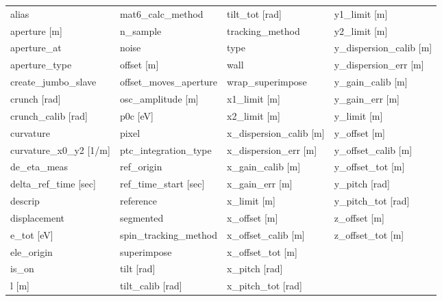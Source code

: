  \begin{tabular}{llll} \toprule
alias                            & mat6_calc_method                 & tilt_tot [rad]                   & y1_limit [m]                     \\
aperture [m]                     & n_sample                         & tracking_method                  & y2_limit [m]                     \\
aperture_at                      & noise                            & type                             & y_dispersion_calib [m]           \\
aperture_type                    & offset [m]                       & wall                             & y_dispersion_err [m]             \\
create_jumbo_slave               & offset_moves_aperture            & wrap_superimpose                 & y_gain_calib [m]                 \\
crunch [rad]                     & osc_amplitude [m]                & x1_limit [m]                     & y_gain_err [m]                   \\
crunch_calib [rad]               & p0c [eV]                         & x2_limit [m]                     & y_limit [m]                      \\
curvature                        & pixel                            & x_dispersion_calib [m]           & y_offset [m]                     \\
curvature_x0_y2 [1/m]            & ptc_integration_type             & x_dispersion_err [m]             & y_offset_calib [m]               \\
de_eta_meas                      & ref_origin                       & x_gain_calib [m]                 & y_offset_tot [m]                 \\
delta_ref_time [sec]             & ref_time_start [sec]             & x_gain_err [m]                   & y_pitch [rad]                    \\
descrip                          & reference                        & x_limit [m]                      & y_pitch_tot [rad]                \\
displacement                     & segmented                        & x_offset [m]                     & z_offset [m]                     \\
e_tot [eV]                       & spin_tracking_method             & x_offset_calib [m]               & z_offset_tot [m]                 \\
ele_origin                       & superimpose                      & x_offset_tot [m]                 &                                  \\
is_on                            & tilt [rad]                       & x_pitch [rad]                    &                                  \\
l [m]                            & tilt_calib [rad]                 & x_pitch_tot [rad]                &                                  \\
 \bottomrule
 \end{tabular}
 \vfill
 
